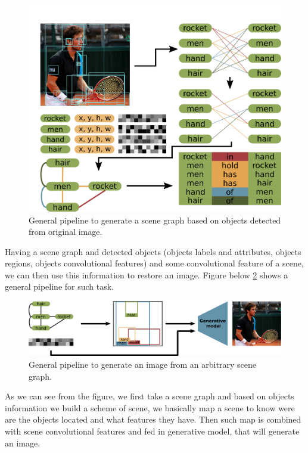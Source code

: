 \begin{figure}[!h]
    \centering
    \includegraphics[width=\textwidth]{figure/sgg-pipeline.png}
    \caption{General pipeline to generate a scene graph based on objects detected from original image.}
    \label{sgg-pipeline}
\end{figure}

Having a scene graph and detected objects (objects labels and attributes, objects regions, objects convolutional features) and some convolutional feature of a scene, we can then use this information to restore an image. Figure below \ref{image-generation-from-sg} shows a general pipeline for such task.

\begin{figure}[!h]
    \centering
    \includegraphics[width=\textwidth]{figure/image-generation-from-sg.png}
    \caption{General pipeline to generate an image from an arbitrary scene graph.}
    \label{image-generation-from-sg}
\end{figure}

As we can see from the figure, we first take a scene graph and based on objects information we build a scheme of scene, we basically map a scene to know were are the objects located and what features they have. Then such map is combined with scene convolutional features and fed in generative model, that will generate an image.

